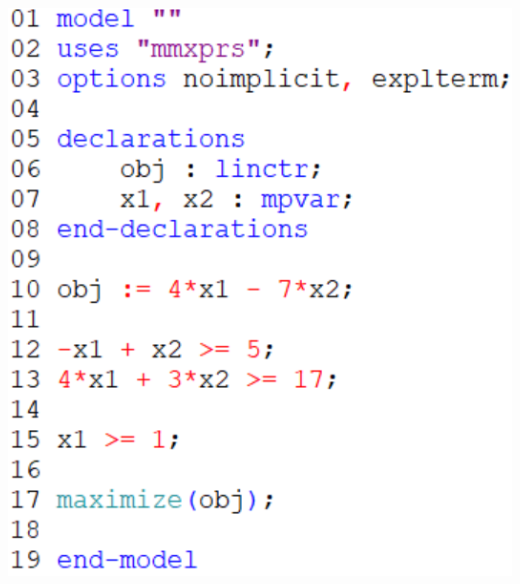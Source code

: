 \documentclass[12pt]{article}
\theoremstyle{definition}
\begin{document}
\begin{center}
\begin{minipage}{0.3\textwidth}
    \end{minipage}
    \begin{minipage}{0.3\textwidth}
        \includegraphics[width=\textwidth]{code2c.png}
    \end{minipage}
\end{center}
\end{document}
